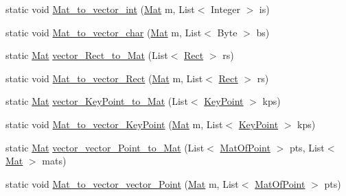 \begin{DoxyCompactItemize}
\item 
static void \mbox{\hyperlink{classorg_1_1opencv_1_1utils_1_1_converters_a910b4c280e18930dd879c2ee92b8b658}{Mat\+\_\+to\+\_\+vector\+\_\+int}} (\mbox{\hyperlink{classorg_1_1opencv_1_1core_1_1_mat}{Mat}} m, List$<$ Integer $>$ is)
\item 
static void \mbox{\hyperlink{classorg_1_1opencv_1_1utils_1_1_converters_ab3a9cdc96a6bb11e432cc05ac382a794}{Mat\+\_\+to\+\_\+vector\+\_\+char}} (\mbox{\hyperlink{classorg_1_1opencv_1_1core_1_1_mat}{Mat}} m, List$<$ Byte $>$ bs)
\item 
static \mbox{\hyperlink{classorg_1_1opencv_1_1core_1_1_mat}{Mat}} \mbox{\hyperlink{classorg_1_1opencv_1_1utils_1_1_converters_a74ab22dcca24c503cc46aaf391fafed3}{vector\+\_\+\+Rect\+\_\+to\+\_\+\+Mat}} (List$<$ \mbox{\hyperlink{classorg_1_1opencv_1_1core_1_1_rect}{Rect}} $>$ rs)
\item 
static void \mbox{\hyperlink{classorg_1_1opencv_1_1utils_1_1_converters_a5226705fc963bb2220d23d05e38231ce}{Mat\+\_\+to\+\_\+vector\+\_\+\+Rect}} (\mbox{\hyperlink{classorg_1_1opencv_1_1core_1_1_mat}{Mat}} m, List$<$ \mbox{\hyperlink{classorg_1_1opencv_1_1core_1_1_rect}{Rect}} $>$ rs)
\item 
static \mbox{\hyperlink{classorg_1_1opencv_1_1core_1_1_mat}{Mat}} \mbox{\hyperlink{classorg_1_1opencv_1_1utils_1_1_converters_abf61fd19c788e167c02789e180f4428a}{vector\+\_\+\+Key\+Point\+\_\+to\+\_\+\+Mat}} (List$<$ \mbox{\hyperlink{classorg_1_1opencv_1_1features2d_1_1_key_point}{Key\+Point}} $>$ kps)
\item 
static void \mbox{\hyperlink{classorg_1_1opencv_1_1utils_1_1_converters_a19a802df638bc4b211d527d2c8316f16}{Mat\+\_\+to\+\_\+vector\+\_\+\+Key\+Point}} (\mbox{\hyperlink{classorg_1_1opencv_1_1core_1_1_mat}{Mat}} m, List$<$ \mbox{\hyperlink{classorg_1_1opencv_1_1features2d_1_1_key_point}{Key\+Point}} $>$ kps)
\item 
static \mbox{\hyperlink{classorg_1_1opencv_1_1core_1_1_mat}{Mat}} \mbox{\hyperlink{classorg_1_1opencv_1_1utils_1_1_converters_a6fa05e084aae69774eae2a6fb0dc07c1}{vector\+\_\+vector\+\_\+\+Point\+\_\+to\+\_\+\+Mat}} (List$<$ \mbox{\hyperlink{classorg_1_1opencv_1_1core_1_1_mat_of_point}{Mat\+Of\+Point}} $>$ pts, List$<$ \mbox{\hyperlink{classorg_1_1opencv_1_1core_1_1_mat}{Mat}} $>$ mats)
\item 
static void \mbox{\hyperlink{classorg_1_1opencv_1_1utils_1_1_converters_aec21660777ba1773bbcdbb251ae8680e}{Mat\+\_\+to\+\_\+vector\+\_\+vector\+\_\+\+Point}} (\mbox{\hyperlink{classorg_1_1opencv_1_1core_1_1_mat}{Mat}} m, List$<$ \mbox{\hyperlink{classorg_1_1opencv_1_1core_1_1_mat_of_point}{Mat\+Of\+Point}} $>$ pts)

\end{DoxyCompactItemize}
